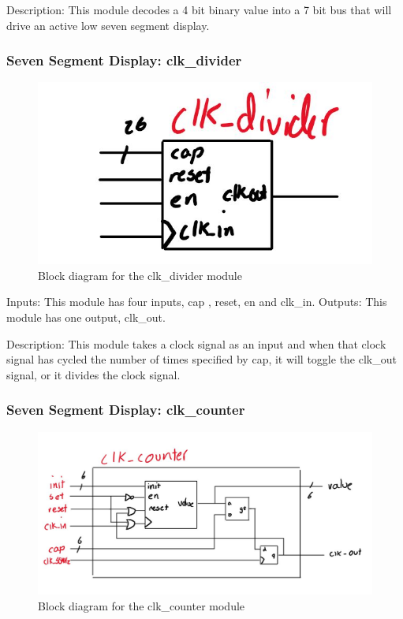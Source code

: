 \documentclass[a4paper]{article}
\begin{document}
Description: This module decodes a 4 bit binary value into a 7 bit bus that will drive an active low seven segment display.

\subsubsection{Seven Segment Display: clk_divider}
\begin{figure}[H]
    \includegraphics[width=0.8 \linewidth]{images/clk_divider.JPG}
    \caption{Block diagram for the clk_divider module}
    \label{clk_driver}
\end{figure}

Inputs: This module has four inputs, cap , reset, en and clk_in.
Outputs: This module has one output, clk_out.

Description: This module takes a clock signal as an input and when that clock signal has cycled the number of times specified by cap, it will toggle the clk_out signal, or it divides the clock signal.

\subsubsection{Seven Segment Display: clk_counter}
\begin{figure}[H]
    \includegraphics[width=0.8 \linewidth]{images/clk_counter.JPG}
    \caption{Block diagram for the clk_counter module}
    \label{clk_counter}
\end{figure}
\end{document}
